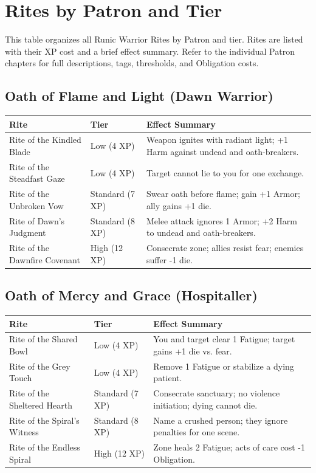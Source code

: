 \section{Rites by Patron and Tier}

This table organizes all Runic Warrior Rites by Patron and tier. Rites are listed with their XP cost and a brief effect summary. Refer to the individual Patron chapters for full descriptions, tags, thresholds, and Obligation costs.

\subsection{Oath of Flame and Light (Dawn Warrior)}

\begin{longtable}{p{} p{} p{}}
\hline
\textbf{Rite} & \textbf{Tier} & \textbf{Effect Summary} \\
\hline
Rite of the Kindled Blade & Low (4 XP) & Weapon ignites with radiant light; +1 Harm against undead and oath-breakers. \\
Rite of the Steadfast Gaze & Low (4 XP) & Target cannot lie to you for one exchange. \\
Rite of the Unbroken Vow & Standard (7 XP) & Swear oath before flame; gain +1 Armor; ally gains +1 die. \\
Rite of Dawn's Judgment & Standard (8 XP) & Melee attack ignores 1 Armor; +2 Harm to undead and oath-breakers. \\
Rite of the Dawnfire Covenant & High (12 XP) & Consecrate zone; allies resist fear; enemies suffer -1 die. \\
\hline
\end{longtable}

\subsection{Oath of Mercy and Grace (Hospitaller)}

\begin{longtable}{p{} p{} p{}}
\hline
\textbf{Rite} & \textbf{Tier} & \textbf{Effect Summary} \\
\hline
Rite of the Shared Bowl & Low (4 XP) & You and target clear 1 Fatigue; target gains +1 die vs. fear. \\
Rite of the Grey Touch & Low (4 XP) & Remove 1 Fatigue or stabilize a dying patient. \\
Rite of the Sheltered Hearth & Standard (7 XP) & Consecrate sanctuary; no violence initiation; dying cannot die. \\
Rite of the Spiral's Witness & Standard (8 XP) & Name a crushed person; they ignore penalties for one scene. \\
Rite of the Endless Spiral & High (12 XP) & Zone heals 2 Fatigue; acts of care cost -1 Obligation. \\
\hline
\end{longtable}


